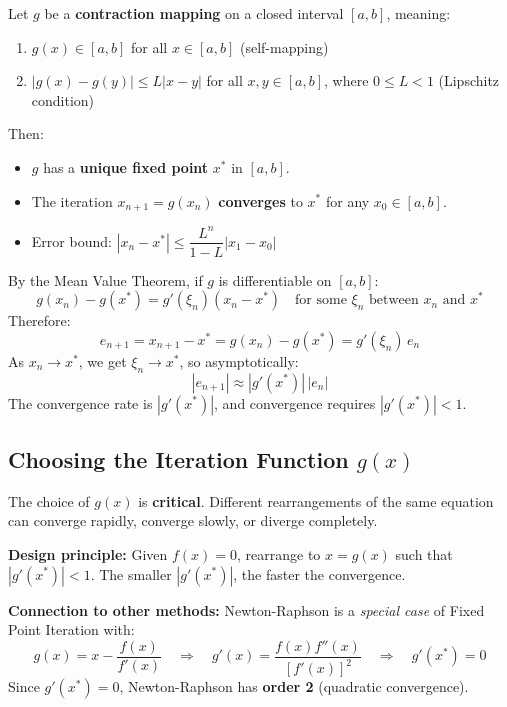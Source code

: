 \documentclass[12pt]{article}
\begin{document}
\bigskip

\begin{thmbox}
Let $g$ be a \textbf{contraction mapping} on a closed interval $[a,b]$, meaning:
\begin{enumerate}[noitemsep]
  \item $g(x) \in [a,b]$ for all $x \in [a,b]$ \hfill(self-mapping)
  \item $|g(x) - g(y)| \leq L|x - y|$ for all $x,y \in [a,b]$, where $0 \leq L < 1$ \hfill(Lipschitz condition)
\end{enumerate}
Then:
\begin{itemize}[noitemsep]
  \item $g$ has a \textbf{unique fixed point} $x^*$ in $[a,b]$.
  \item The iteration $x_{n+1} = g(x_n)$ \textbf{converges} to $x^*$ for any $x_0 \in [a,b]$.
  \item Error bound: $|x_n - x^*| \leq \dfrac{L^n}{1-L}|x_1 - x_0|$
\end{itemize}
\end{thmbox}

\bigskip

\begin{derivbox}
By the Mean Value Theorem, if $g$ is differentiable on $[a,b]$:
\[
  g(x_n) - g(x^*) = g'(\xi_n)(x_n - x^*)
  \quad\text{for some } \xi_n \text{ between } x_n \text{ and } x^*
\]
Therefore:
\[
  e_{n+1} = x_{n+1} - x^* = g(x_n) - g(x^*) = g'(\xi_n)\,e_n
\]
As $x_n \to x^*$, we get $\xi_n \to x^*$, so asymptotically:
\[
  |e_{n+1}| \approx |g'(x^*)|\,|e_n|
\]
The convergence rate is $|g'(x^*)|$, and convergence requires $|g'(x^*)| < 1$.
\end{derivbox}

\bigskip

\subsection*{Choosing the Iteration Function $g(x)$}

\begin{keybox}
The choice of $g(x)$ is \textbf{critical}. Different rearrangements of the same equation can converge rapidly, converge slowly, or diverge completely.

\medskip
\textbf{Design principle:} Given $f(x) = 0$, rearrange to $x = g(x)$ such that $|g'(x^*)| < 1$. The smaller $|g'(x^*)|$, the faster the convergence.

\medskip
\textbf{Connection to other methods:} Newton-Raphson is a \textit{special case} of Fixed Point Iteration with:
\[
  g(x) = x - \frac{f(x)}{f'(x)}
  \quad\Rightarrow\quad
  g'(x) = \frac{f(x)f''(x)}{[f'(x)]^2}
  \quad\Rightarrow\quad
  g'(x^*) = 0
\]
Since $g'(x^*) = 0$, Newton-Raphson has \textbf{order 2} (quadratic convergence).
\end{keybox}
\end{document}
